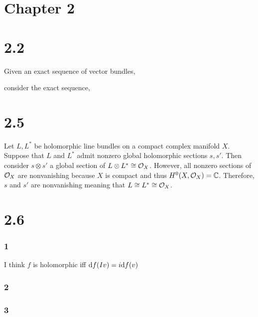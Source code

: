 \documentclass[12pt]{article}
\begin{document}
\section{Chapter 2}

\section{2.2}

Given an exact sequence of vector bundles,
\begin{center}
\end{center}
consider the exact sequence,
\begin{center}
\begin{tikzcd}

\end{tikzcd}
\end{center}

\section{2.5}


Let $L, L^*$ be holomorphic line bundles on a compact complex manifold $X$. Suppose that $L$ and $L^*$ admit nonzero global holomorphic sections $s, s'$. Then consider $s \otimes s'$ a global section of $L \otimes L^* \cong \struct{X}$. However, all nonzero sections of $\struct{X}$ are nonvanishing because $X$ is compact and thus $H^0(X, \struct{X}) = \C$. Therefore, $s$ and $s'$ are nonvanishing meaning that $L \cong L^* \cong \struct{X}$.

\section{2.6}

\subsubsection{1}

I think $f$ is holomorphic iff $\d{f}(Iv) = i \d{f} (v)$

\subsubsection{2}

\subsubsection{3}
\end{document}
